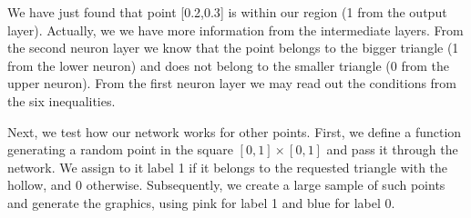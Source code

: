 \documentclass[letterpaper,10pt,english]{jupyterBook}
\begin{document}
\noindent{}

\sphinxAtStartPar
We have just found that point {[}0.2,0.3{]} is within our region (1 from the output layer). Actually, we we have more information from the intermediate layers. From the second neuron layer we know that the point belongs to the bigger triangle (1 from the lower neuron) and does not belong to the smaller triangle (0 from the upper neuron). From the first neuron layer we may read out the conditions from the six inequalities.

\sphinxAtStartPar
Next, we test how our network works for other points. First, we define a function generating a  random point in the square \([0,1]\times [0,1]\) and pass it through the network. We assign to it label 1 if it belongs to the requested triangle with the hollow, and 0 otherwise. Subsequently, we create a large sample of such points and generate the graphics, using pink for label 1 and blue for label 0.

\begin{sphinxVerbatim}[commandchars=\\\{\}]
 
    \PYG{p}{[}\PYG{p}{]} 
                 
     \PYG{p}{[}\PYG{p}{[}\PYG{p}{]}\PYG{p}{[}\PYG{p}{]}\PYG{p}{[}\PYG{p}{]}\PYG{p}{[}\PYG{p}{]}\PYG{p}{]}               
\end{sphinxVerbatim}

\begin{sphinxVerbatim}[commandchars=\\\{\}]
\PYG{p}{[}    \PYG{p}{]}
\PYG{p}{[}\PYG{p}{]}
\end{sphinxVerbatim}
\end{document}
